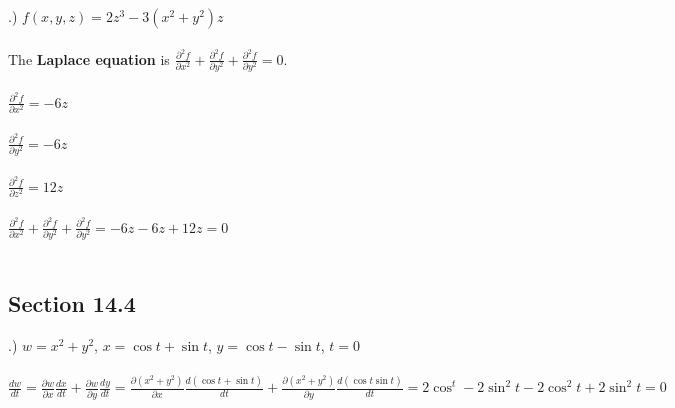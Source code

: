 \documentclass[12pt]{article}
\begin{document}
.) $f(x,y,z)=2z^{3}-3(x^{2}+y^{2})z$\\\\
\noindent The \textbf{Laplace equation} is $\frac{\partial ^{2}f}{\partial x^{2}} + 
\frac{\partial ^{2}f}{\partial y^{2}} + \frac{\partial^{2} f}{\partial y^{2}} = 0$.\\\\
\noindent $\frac{\partial ^{2}f}{\partial x^{2}} = -6z$\\\\
\noindent $\frac{\partial ^{2}f}{\partial y^{2}} = -6z$\\\\
\noindent $\frac{\partial ^{2}f}{\partial z^{2}} = 12z$\\\\
\noindent $\frac{\partial ^{2}f}{\partial x^{2}} + \frac{\partial ^{2}f}{\partial y^{2}} + \frac{\partial^{2} f}{\partial y^{2}} = 
-6z -6z + 12z = 0$\\\\ 


\subsection*{Section 14.4}
.) $w = x^{2} + y^{2}$, \hspace{10pt} $x = \cos{t} + \sin{t}$, \hspace{10pt} $y = \cos{t} - \sin{t}$, \hspace{10pt} $t=0$\\\\
\noindent $\frac{dw}{dt} = \frac{\partial w}{\partial x} \frac{dx}{dt} + \frac{\partial w}{\partial y}\frac{dy}{dt}
=\frac{\partial (x^{2} + y^{2})}{\partial x}\frac{d(\cos{t} + \sin{t})}{dt} 
+ \frac{\partial (x^{2} + y^{2})}{\partial y}\frac{d(\cos{t}\sin{t})}{dt} = 2\cos^{t}-2\sin^{2}{t}-2\cos^{2}{t}+2\sin^{2}{t} = 0$\\\\
\end{document}

